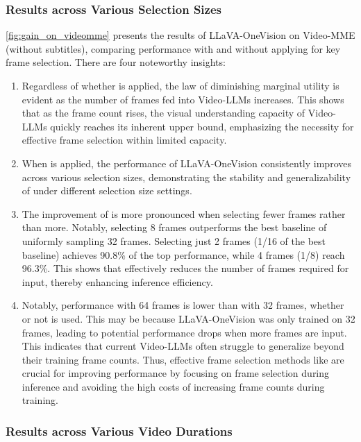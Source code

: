 \subsubsection{Results across Various Selection Sizes}\label{sssec:ravss}

\cref{fig:gain_on_videomme} presents the results of LLaVA-OneVision on Video-MME (without subtitles), comparing performance with and without applying \mname{} for key frame selection. 
There are four noteworthy insights:
\begin{enumerate}
	\item Regardless of whether \mname{} is applied, the law of diminishing marginal utility is evident as the number of frames fed into Video-LLMs increases.
		This shows that as the frame count rises, the visual understanding capacity of Video-LLMs quickly reaches its inherent upper bound, emphasizing the necessity for effective frame selection within limited capacity.
	\item When \mname{} is applied, the performance of LLaVA-OneVision consistently improves across various selection sizes, demonstrating the stability and generalizability of \mname{} under different selection size settings.
	\item The improvement of \mname{} is more pronounced when selecting fewer frames rather than more. 
		Notably, selecting 8 frames outperforms the best baseline of uniformly sampling 32 frames.
		Selecting just 2 frames (1/16 of the best baseline) achieves 90.8\% of the top performance, while 4 frames (1/8) reach 96.3\%.
		This shows that \mname{} effectively reduces the number of frames required for input, thereby enhancing inference efficiency.
	\item Notably, performance with 64 frames is lower than with 32 frames, whether or not \mname{} is used.
	This may be because LLaVA-OneVision was only trained on 32 frames, leading to potential performance drops when more frames are input.
	This indicates that current Video-LLMs often struggle to generalize beyond their training frame counts.
	Thus, effective frame selection methods like \mname{} are crucial for improving performance by focusing on frame selection during inference and avoiding the high costs of increasing frame counts during training.
\end{enumerate}


\subsubsection{Results across Various Video Durations}


